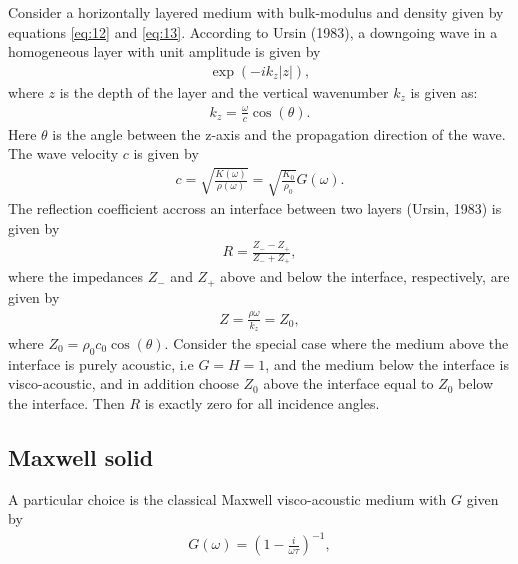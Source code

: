 \documentclass[11pt]{article}
\begin{document}
 Consider a horizontally layered medium with bulk-modulus and density
 given by equations \ref{eq:12} and \ref{eq:13}. According to Ursin
 (1983), a downgoing wave in a homogeneous layer with unit amplitude is given by
\begin{eqnarray}
 \exp(-ik_z |z|),
                               \label{eq:16}
\end{eqnarray}
where $z$ is the depth of the layer and the vertical wavenumber $k_z$
is given as:
\begin{eqnarray}
 k_z = \frac{\omega}{c}\cos(\theta).
                               \label{eq:17}
\end{eqnarray}
Here $\theta$ is the angle between the z-axis and the propagation
direction of the wave.
The wave velocity $c$ is given
by
\begin{eqnarray}
 c=\sqrt{\frac{K(\omega)}{\rho(\omega)}} = 
 \sqrt{\frac{K_0}{\rho_0}}G(\omega).
                               \label{eq:18}
\end{eqnarray}
 The reflection coefficient
 accross an interface between two layers (Ursin, 1983) is given by
\begin{eqnarray}
  R = \frac{Z_- - Z_+}{Z_ - + Z_+}, 
                               \label{eq:19}
\end{eqnarray}
where the impedances $Z_-$ and $Z_+$ above and below the interface,
respectively, are given by
\begin{eqnarray}
 Z = \frac{\rho\omega}{k_z} = Z_0 ,
\end{eqnarray}
where $Z_0 = \rho_0 c_0\cos(\theta)$.
Consider the special case where the medium above the interface is
purely acoustic, i.e $G=H=1$, and the medium below the interface is
visco-acoustic, and in addition choose $Z_0$ above the interface equal
to $Z_0$ below the interface. Then $R$ is exactly zero for all incidence
angles.
\subsection*{Maxwell solid}
A particular choice is the classical Maxwell visco-acoustic
medium with $G$ given by \citep{Casula1992}
\begin{eqnarray}
 G(\omega) = \left({1-\frac{i}{\omega\tau}}\right)^{-1},
                                    \label{eq:21}
\end{eqnarray}
\end{document}

